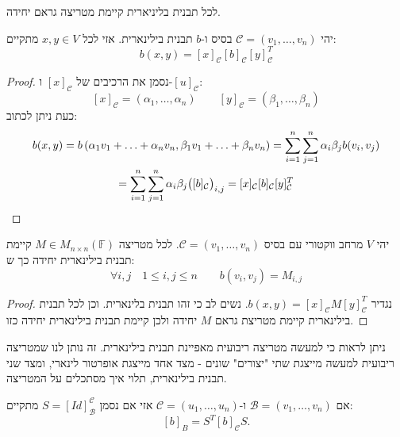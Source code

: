 \documentclass{tstextbook}
\begin{document}
\begin{corollary}
לכל תבנית בליניארית קיימת מטריצה גראם יחידה.

\end{corollary}
\begin{proposition}
יהי \(\mathcal{C}=\left( v_{1},\dots,v_{n} \right)\)  בסיס ו-\(b\) תבנית בילינארית. אזי לכל \(x,y \in V\) מתקיים:
$$b(x,y)=[x]_{\mathcal{C}}[b]_{\mathcal{C}}[y]_{\mathcal{C}}^{T}$$

\end{proposition}
\begin{proof}
נסמן את הרכיבים של \([x]_{\mathcal{C}}\) ו-\([u]_{\mathcal{C}}\):
$$[x]_{\mathcal{C}}=\left( \alpha_{1},\ldots,\alpha_{n} \right)\qquad [y]_{\mathcal{C}}=\left( \beta_{1},\ldots,\beta_{n} \right)$$
כעת ניתן לכתוב:
\begin{gather*}b(x,y)=b\left( \alpha_{1}v_{1}+\ldots+\alpha_{n}v_{n},\beta_{1}v_{1}+\ldots+\beta_{n}v_{n} \right)=\sum_{i=1}^{n}\sum_{j=1}^{n}\alpha_{i}\beta_{j}b(v_{i},v_{j})  \\=\sum_{i=1}^{n}\sum_{j=1}^{n}\alpha_{i}\beta_{j}\big{(}[b]_{\mathcal{C}}\big{)}_{i,j}=[x]_{\mathcal{C}}[b]_{\mathcal{C}}[y]_{\mathcal{C}}^{T}
\end{gather*}

\end{proof}
\begin{corollary}
יהי \(V\) מרחב ווקטורי עם בסיס \(\mathcal{C}=\left( v_{1},\dots,v_{n} \right)\). לכל מטריצה \(M \in M_{n\times n}\left( \mathbb{F}  \right)\) קיימת תבנית בילינארית יחידה כך ש:
$$\forall i,j\quad  1\leq i,j\leq n\qquad b(v_{i},v_{j})=M_{i,j}$$

\end{corollary}
\begin{proof}
נגדיר \(b(x,y)=[x]_{\mathcal{C}}M[y]_{\mathcal{C}}^{T}\). נשים לב כי זהו תבנית בלינארית. וכן לכל תבנית בילינארית קיימת מטריצת גראם \(M\) יחידה ולכן קיימת תבנית בילינארית יחידה כזו.

\end{proof}
\begin{remark}
ניתן לראות כי למעשה מטריצה ריבועית מאפיינת תבנית בילינארית. זה נותן לנו שמטריצה ריבועית למעשה מייצגת שתי "יצורים" שונים - מצד אחד מייצגת אופרטור לינארי, ומצד שני תבנית בילינארית, תלוי איך מסתכלים על המטריצה.

\end{remark}
\begin{proposition}
אם \(\mathcal{B}=\left( v_{1},\dots,v_{n} \right)\) ו-\(\mathcal{C}=\left( u_{1},\dots,u_{n} \right)\) אזי אם נסמן \(S=[Id]_{\mathcal{B}}^{\mathcal{C}}\) מתקיים:
$$[b]_{B}=S^{T}[b]_{\mathcal{C}}S.$$

\end{proposition}
\end{document}
